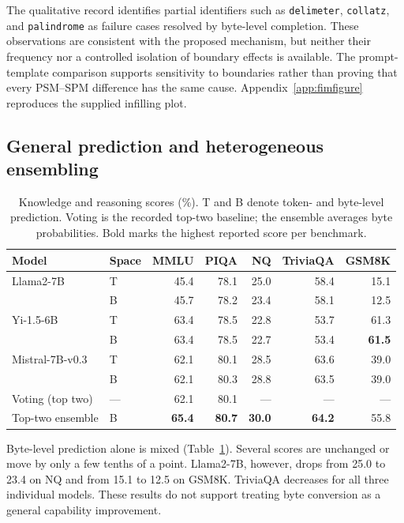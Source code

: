 \documentclass{article}
\begin{document}
The qualitative record identifies partial identifiers such as \texttt{delimeter}, \texttt{collatz}, and \texttt{palindrome} as failure cases resolved by byte-level completion. These observations are consistent with the proposed mechanism, but neither their frequency nor a controlled isolation of boundary effects is available. The prompt-template comparison supports sensitivity to boundaries rather than proving that every PSM--SPM difference has the same cause. Appendix~\ref{app:fimfigure} reproduces the supplied infilling plot.

\subsection{General prediction and heterogeneous ensembling}
\label{sec:general}
\begin{table}[t]
\caption{Knowledge and reasoning scores (\%). T and B denote token- and byte-level prediction. Voting is the recorded top-two baseline; the ensemble averages byte probabilities. Bold marks the highest reported score per benchmark.}
\label{tab:general}
\centering
\setlength{\tabcolsep}{4pt}
\begin{tabular}{llrrrrr}
\toprule
Model & Space & MMLU & PIQA & NQ & TriviaQA & GSM8K \\
\midrule
Llama2-7B & T & 45.4 & 78.1 & 25.0 & 58.4 & 15.1 \\
 & B & 45.7 & 78.2 & 23.4 & 58.1 & 12.5 \\
Yi-1.5-6B & T & 63.4 & 78.5 & 22.8 & 53.7 & 61.3 \\
 & B & 63.4 & 78.5 & 22.7 & 53.4 & \textbf{61.5} \\
Mistral-7B-v0.3 & T & 62.1 & 80.1 & 28.5 & 63.6 & 39.0 \\
 & B & 62.1 & 80.3 & 28.8 & 63.5 & 39.0 \\
\midrule
Voting (top two) & --- & 62.1 & 80.1 & --- & --- & --- \\
Top-two ensemble & B & \textbf{65.4} & \textbf{80.7} & \textbf{30.0} & \textbf{64.2} & 55.8 \\
\bottomrule
\end{tabular}
\end{table}

Byte-level prediction alone is mixed (Table~\ref{tab:general}). Several scores are unchanged or move by only a few tenths of a point. Llama2-7B, however, drops from 25.0 to 23.4 on NQ and from 15.1 to 12.5 on GSM8K. TriviaQA decreases for all three individual models. These results do not support treating byte conversion as a general capability improvement.
\end{document}
